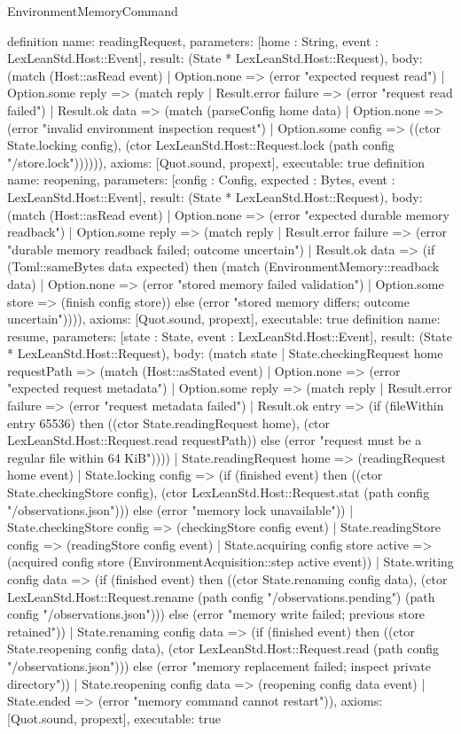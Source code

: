 \begin{lexlean}{EnvironmentMemoryCommand}
\begin{semanticmodule}
{}
definition{
 name: readingRequest, parameters: [home : String, event : LexLeanStd.Host::Event], result: (State * LexLeanStd.Host::Request),
 body: (match (Host::asRead event) | Option.none => (error "expected request read") | Option.some reply => (match reply | Result.error failure => (error "request read failed") | Result.ok data => (match (parseConfig home data) | Option.none => (error "invalid environment inspection request") | Option.some config => ((ctor State.locking config), (ctor LexLeanStd.Host::Request.lock (path config "/store.lock")))))), axioms: [Quot.sound, propext], executable: true
}
definition{
 name: reopening, parameters: [config : Config, expected : Bytes, event : LexLeanStd.Host::Event], result: (State * LexLeanStd.Host::Request),
 body: (match (Host::asRead event) | Option.none => (error "expected durable memory readback") | Option.some reply => (match reply | Result.error failure => (error "durable memory readback failed; outcome uncertain") | Result.ok data => (if (Toml::sameBytes data expected) then (match (EnvironmentMemory::readback data) | Option.none => (error "stored memory failed validation") | Option.some store => (finish config store)) else (error "stored memory differs; outcome uncertain")))), axioms: [Quot.sound, propext], executable: true
}
definition{
 name: resume, parameters: [state : State, event : LexLeanStd.Host::Event], result: (State * LexLeanStd.Host::Request),
 body: (match state | State.checkingRequest home requestPath => (match (Host::asStated event) | Option.none => (error "expected request metadata") | Option.some reply => (match reply | Result.error failure => (error "request metadata failed") | Result.ok entry => (if (fileWithin entry 65536) then ((ctor State.readingRequest home), (ctor LexLeanStd.Host::Request.read requestPath)) else (error "request must be a regular file within 64 KiB")))) | State.readingRequest home => (readingRequest home event) | State.locking config => (if (finished event) then ((ctor State.checkingStore config), (ctor LexLeanStd.Host::Request.stat (path config "/observations.json"))) else (error "memory lock unavailable")) | State.checkingStore config => (checkingStore config event) | State.readingStore config => (readingStore config event) | State.acquiring config store active => (acquired config store (EnvironmentAcquisition::step active event)) | State.writing config data => (if (finished event) then ((ctor State.renaming config data), (ctor LexLeanStd.Host::Request.rename (path config "/observations.pending") (path config "/observations.json"))) else (error "memory write failed; previous store retained")) | State.renaming config data => (if (finished event) then ((ctor State.reopening config data), (ctor LexLeanStd.Host::Request.read (path config "/observations.json"))) else (error "memory replacement failed; inspect private directory")) | State.reopening config data => (reopening config data event) | State.ended => (error "memory command cannot restart")), axioms: [Quot.sound, propext], executable: true
}
\end{semanticmodule}
\end{lexlean}
